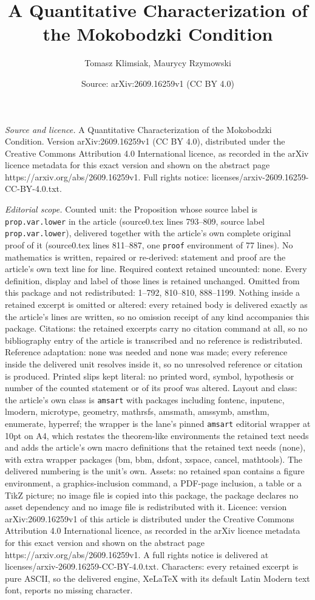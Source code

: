 \documentclass[10pt,a4paper]{amsart}
\title[A Quantitative Characterization of the Mokobodzki Condition]{A Quantitative Characterization of the Mokobodzki Condition}
\author{Tomasz Klimsiak, Maurycy Rzymowski}
\date{Source: arXiv:2609.16259v1 (CC BY 4.0)}
\begin{document}
\maketitle

\noindent\emph{Source and licence.} A Quantitative Characterization of the Mokobodzki Condition. Version arXiv:2609.16259v1 (CC BY 4.0), distributed under the Creative Commons Attribution 4.0 International licence, as recorded in the arXiv licence metadata for this exact version and shown on the abstract page https://arxiv.org/abs/2609.16259v1. Full rights notice: licenses/arxiv-2609.16259-CC-BY-4.0.txt.\par\smallskip

\noindent\textit{Editorial scope.} Counted unit: the Proposition whose source label is \texttt{prop.var.lower} in the article (source0.tex lines 793--809, source label \texttt{prop.var.lower}), delivered together with the article's own complete original proof of it (source0.tex lines 811--887, one \texttt{proof} environment of 77 lines). No mathematics is written, repaired or re-derived: statement and proof are the article's own text line for line. Required context retained uncounted: none. Every definition, display and label of those lines is retained unchanged. Omitted from this package and not redistributed: 1--792, 810--810, 888--1199. Nothing inside a retained excerpt is omitted or altered: every retained body is delivered exactly as the article's lines are written, so no omission receipt of any kind accompanies this package. Citations: the retained excerpts carry no citation command at all, so no bibliography entry of the article is transcribed and no reference is redistributed. Reference adaptation: none was needed and none was made; every reference inside the delivered unit resolves inside it, so no unresolved reference or citation is produced. Printed slips kept literal: no printed word, symbol, hypothesis or number of the counted statement or of its proof was altered. Layout and class: the article's own class is \texttt{amsart} with packages including fontenc, inputenc, lmodern, microtype, geometry, mathrsfs, amsmath, amssymb, amsthm, enumerate, hyperref; the wrapper is the lane's pinned \texttt{amsart} editorial wrapper at 10pt on A4, which restates the theorem-like environments the retained text needs and adds the article's own macro definitions that the retained text needs (none), with extra wrapper packages (bm, bbm, dsfont, xspace, cancel, mathtools). The delivered numbering is the unit's own. Assets: no retained span contains a figure environment, a graphics-inclusion command, a PDF-page inclusion, a table or a TikZ picture; no image file is copied into this package, the package declares no asset dependency and no image file is redistributed with it. Licence: version arXiv:2609.16259v1 of this article is distributed under the Creative Commons Attribution 4.0 International licence, as recorded in the arXiv licence metadata for this exact version and shown on the abstract page https://arxiv.org/abs/2609.16259v1. A full rights notice is delivered at licenses/arxiv-2609.16259-CC-BY-4.0.txt. Characters: every retained excerpt is pure ASCII, so the delivered engine, XeLaTeX with its default Latin Modern text font, reports no missing character.
\end{document}
